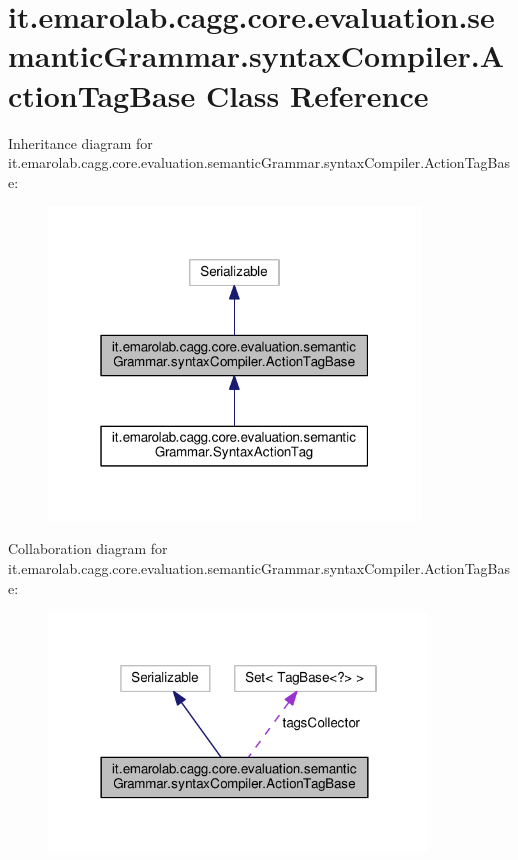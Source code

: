 \hypertarget{classit_1_1emarolab_1_1cagg_1_1core_1_1evaluation_1_1semanticGrammar_1_1syntaxCompiler_1_1ActionTagBase}{\section{it.\-emarolab.\-cagg.\-core.\-evaluation.\-semantic\-Grammar.\-syntax\-Compiler.\-Action\-Tag\-Base Class Reference}
\label{classit_1_1emarolab_1_1cagg_1_1core_1_1evaluation_1_1semanticGrammar_1_1syntaxCompiler_1_1ActionTagBase}
}


Inheritance diagram for it.\-emarolab.\-cagg.\-core.\-evaluation.\-semantic\-Grammar.\-syntax\-Compiler.\-Action\-Tag\-Base\-:\nopagebreak
\begin{figure}[H]
\begin{center}
\leavevmode
\includegraphics[width=280pt]{classit_1_1emarolab_1_1cagg_1_1core_1_1evaluation_1_1semanticGrammar_1_1syntaxCompiler_1_1ActionTagBase__inherit__graph}
\end{center}
\end{figure}


Collaboration diagram for it.\-emarolab.\-cagg.\-core.\-evaluation.\-semantic\-Grammar.\-syntax\-Compiler.\-Action\-Tag\-Base\-:\nopagebreak
\begin{figure}[H]
\begin{center}
\leavevmode
\includegraphics[width=285pt]{classit_1_1emarolab_1_1cagg_1_1core_1_1evaluation_1_1semanticGrammar_1_1syntaxCompiler_1_1ActionTagBase__coll__graph}
\end{center}
\end{figure}
